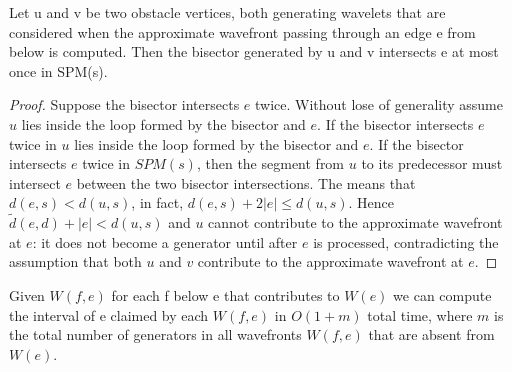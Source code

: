 \begin{Lemma}
	Let u and v be two obstacle vertices, both generating wavelets that are
	considered when the approximate wavefront passing through an edge e from
	below is computed. Then the bisector generated by u and v intersects e at
	most once in SPM(s).
\end{Lemma}

\begin{proof}
	Suppose the bisector intersects $e$ twice. Without lose of generality assume
	$u$ lies inside the loop formed by the bisector and $e$. If the bisector
	intersects $e$ twice in $u$ lies inside the loop formed by the bisector and
	$e$. If the bisector intersects $e$ twice in $SPM(s)$, then the segment from
	$u$ to its predecessor must intersect $e$ between the two bisector
	intersections.  The means that $d(e,s)<d(u,s)$, in fact, $d(e,s)+2|e|\leq
	d(u,s)$. Hence $\tilde{d}(e,d)+|e| < d(u,s)$ and $u$ cannot contribute to
	the approximate wavefront at $e$: it does not become a generator until after
	$e$ is processed, contradicting the assumption that both $u$ and $v$
	contribute to the approximate wavefront at $e$.
\end{proof}

\begin{Lemma} \label{lemma:4.6HersherbergerS99}
	Given $W(f,e)$	for each f below e that contributes to $W(e)$ we can compute
	the interval of e claimed by each $W(f,e)$ in $O(1+m)$ total time, where $m$
	is the total number of generators in all wavefronts $W(f,e)$ that are absent
	from $W(e)$.
\end{Lemma}

